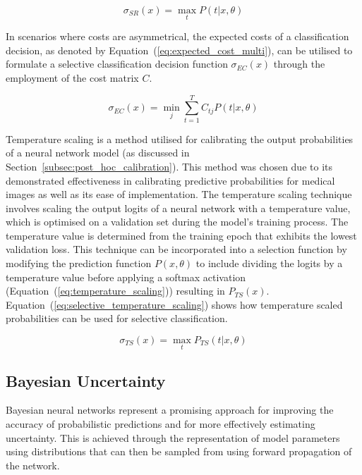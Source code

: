 \begin{equation}
	\sigma_{SR}(x) = \max_tP(t|x,\theta)
	\label{eq:softmax_response}
\end{equation}

\noindent In scenarios where costs are asymmetrical, the expected costs of a classification decision, as denoted by Equation~(\ref{eq:expected_cost_multi}), can be utilised to formulate a selective classification decision function $\sigma_{EC}(x)$ through the employment of the cost matrix $C$. 

\begin{equation}
	\sigma_{EC}(x) = \min_j\sum^T_{t=1}C_{tj}P(t|x,\theta)
	\label{eq:expected_cost_scoring}
\end{equation}

Temperature scaling is a method utilised for calibrating the output probabilities of a neural network model (as discussed in Section~\ref{subsec:post_hoc_calibration}). This method was chosen due to its demonstrated effectiveness in calibrating predictive probabilities for medical images as well as its ease of implementation. The temperature scaling technique involves scaling the output logits of a neural network with a temperature value, which is optimised on a validation set during the model's training process. The temperature value is determined from the training epoch that exhibits the lowest validation loss. This technique can be incorporated into a selection function by modifying the prediction function $P(x, \theta)$ to include dividing the logits by a temperature value before applying a softmax activation (Equation~(\ref{eq:temperature_scaling})) resulting in $P_{TS}(x)$. Equation~(\ref{eq:selective_temperature_scaling}) shows how temperature scaled probabilities can be used for selective classification.

\begin{equation}
	\sigma_{TS}(x) = \max_tP_{TS}(t|x,\theta)
	\label{eq:selective_temperature_scaling}
\end{equation}

\subsection{Bayesian Uncertainty}
\label{subsec:selective_uncertainity}
Bayesian neural networks represent a promising approach for improving the accuracy of probabilistic predictions and for more effectively estimating uncertainty. This is achieved through the representation of model parameters using distributions that can then be sampled from using forward propagation of the network.

